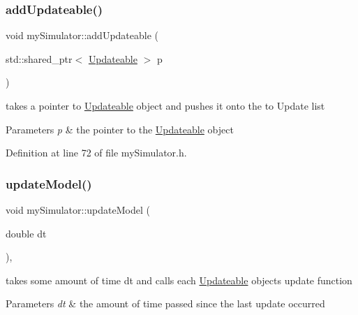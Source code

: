 \subsubsection{\texorpdfstring{addUpdateable()}{addUpdateable()}}
{\footnotesize\ttfamily void my\+Simulator\+::add\+Updateable (\begin{DoxyParamCaption}\item[{std\+::shared\+\_\+ptr$<$ \mbox{\hyperlink{class_updateable}{Updateable}} $>$}]{p }\end{DoxyParamCaption})\hspace{0.3cm}{\ttfamily [inline]}}



takes a pointer to \mbox{\hyperlink{class_updateable}{Updateable}} object and pushes it onto the to Update list 


\begin{DoxyParams}{Parameters}
{\em p} & the pointer to the \mbox{\hyperlink{class_updateable}{Updateable}} object \\
\hline
\end{DoxyParams}


Definition at line 72 of file my\+Simulator.\+h.


\begin{DoxyCode}{0}

\end{DoxyCode}
\mbox{\label{classmy_simulator_a76beefaa645d7785578a59b9f9d41dc9}} 
\subsubsection{\texorpdfstring{updateModel()}{updateModel()}}
{\footnotesize\ttfamily void my\+Simulator\+::update\+Model (\begin{DoxyParamCaption}\item[{double}]{dt }\end{DoxyParamCaption})\hspace{0.3cm}{\ttfamily [inline]}, {\ttfamily [virtual]}}



takes some amount of time dt and calls each \mbox{\hyperlink{class_updateable}{Updateable}} object\textquotesingle{}s update function 


\begin{DoxyParams}{Parameters}
{\em dt} & the amount of time passed since the last update occurred \\
\hline
\end{DoxyParams}


